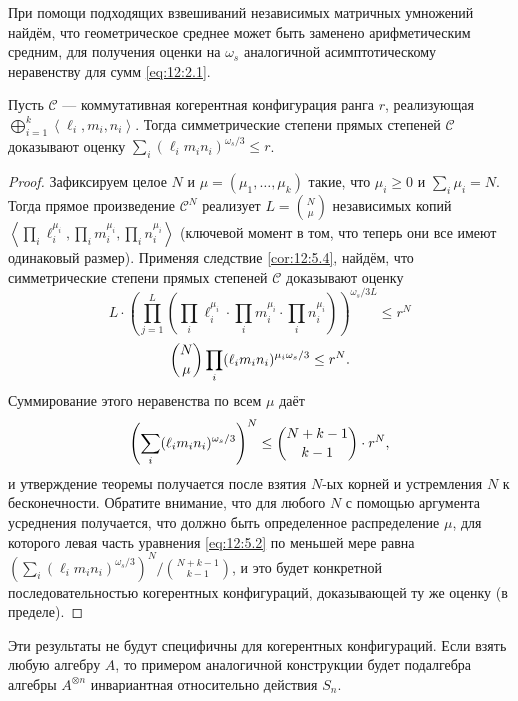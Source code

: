 При помощи подходящих взвешиваний независимых матричных умножений найдём, что геометрическое среднее может быть заменено арифметическим средним, для получения оценки на $\omega_s$ аналогичной асимптотическому неравенству для сумм \eqref{eq:12:2.1}.

\begin{theorem}\label{th:12:5.5} 
  Пусть $\mathscr{C}$ --- коммутативная когерентная конфигурация ранга $r$, реализующая $\bigoplus_{i=1}^k \left\langle \ell_i, m_i, n_i  \right\rangle$. Тогда симметрические степени прямых степеней $\mathscr{C}$ доказывают оценку $\sum_i ( \ell_i m_i n_i)^{\omega_s/3} \leq r$.
\end{theorem}
\begin{proof}
  Зафиксируем целое $N$ и $\mu = (\mu_1, \dotsc, \mu_k)$ такие, что $\mu_i \geq 0$ и $\sum_i \mu_i = N$. Тогда прямое произведение $\mathscr{C}^N$ реализует $L=\binom{N}{\mu}$ независимых копий $\left\langle \prod_i \ell_i^{\mu_i},  \prod_i m_i^{\mu_i}, \prod_i n_i^{\mu_i}\right\rangle$ (ключевой момент в том, что теперь они все имеют одинаковый размер). Применяя следствие \ref{cor:12:5.4}, найдём, что симметрические степени прямых степеней $\mathscr{C}$ доказывают оценку 
  \[
  	L \cdot \left( \prod_{j=1}^L \left( \prod_i \ell_i^{\mu_i} \cdot  \prod_i m_i^{\mu_i} \cdot  \prod_i n_i^{\mu_i} \right) \right)^{\omega_s/3L} \leq r^N
  \]
  \begin{equation}\label{eq:12:5.2}
  	\dbinom{N}{\mu} \prod_i (\ell_i m_i n_i)^{\mu_i \omega_s/3} \leq r^N.
  \end{equation}
  Суммирование этого неравенства по всем $\mu$ даёт
  \[
  	\left( \sum_i (\ell_i m_i n_i)^{\omega_s/3} \right)^N \leq \dbinom{N+k-1}{k-1} \cdot r^N,
  \]
  и утверждение теоремы получается после взятия $N$-ых корней и устремления $N$ к бесконечности. Обратите внимание, что для любого $N$  с помощью аргумента усреднения получается, что должно быть определенное распределение $\mu$, для которого левая часть уравнения \eqref{eq:12:5.2} по меньшей мере равна $\left( \sum_i (\ell_i m_i n_i)^{\omega_s/3} \right)^N / \binom{N+k-1}{k-1}$, и это будет конкретной последовательностью когерентных конфигураций, доказывающей ту же оценку (в пределе).
\end{proof}

Эти результаты не будут специфичны для когерентных конфигураций. Если взять любую алгебру $A$, то примером аналогичной конструкции будет подалгебра алгебры $A^{\otimes n}$ инвариантная относительно действия $S_n$.

